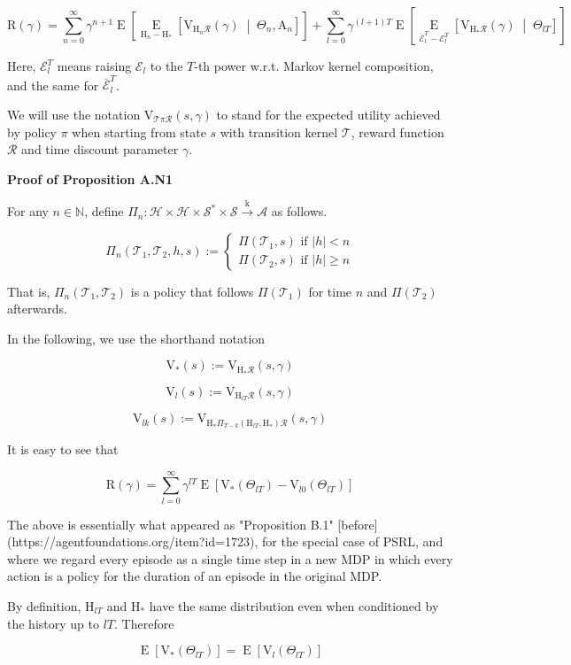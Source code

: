 \documentclass[a4paper]{article}
\newcommand{\Co}[1]{}
\newcommand{\AP}[1]{\left(#1\right)}
\newcommand{\AB}[1]{\left[#1\right]}
\newcommand{\ABM}[2]{\left[#1\;\middle\vert\;#2\right]}
\newcommand{\Ea}[2]{\underset{#1}{\operatorname{E}}\AB{#2}}
\newcommand{\CE}[3]{\underset{#1}{\operatorname{E}}\ABM{#2}{#3}}
\newcommand{\Nats}{\mathbb{N}}
\newcommand{\Abs}[1]{\left\vert #1 \right\vert}
\newcommand{\K}{\xrightarrow{\mathrm{k}}}
\newcommand{\St}{\mathcal{S}}
\newcommand{\A}{\mathcal{A}}
\newcommand{\R}{\mathcal{R}}
\newcommand{\T}{\mathcal{T}}
\newcommand{\Hy}{\mathcal{H}}
\newcommand{\V}{\mathrm{V}}
\newcommand{\Reg}{\mathrm{R}}
\newcommand{\AT}{\mathrm{A}}
\newcommand{\THy}{\mathrm{H}_*}
\newcommand{\SHy}{\mathrm{H}}
\newcommand{\Ev}{\mathcal{E}}
\begin{document}
$$\Reg(\gamma)=\sum_{n=0}^\infty\gamma^{n+1}\Ea{}{\CE{\SHy_n-\THy}{\V_{\SHy_n\R}(\gamma)}{\Theta_n,\AT_n}}+\sum_{l=0}^\infty{\gamma^{(l+1)T}}\Ea{}{\CE{\bar{\Ev}_{l}^T-\Ev_{l}^T}{\V_{\SHy_*\R}(\gamma)}{\Theta_{lT}}}$$

Here, $\Ev_l^T$ means raising $\Ev_l$ to the $T$-th power w.r.t. Markov kernel composition, and the same for $\bar{\Ev}_l^T$.

We will use the notation $\V_{\T\pi\R}(s,\gamma)$ to stand for the expected utility achieved by policy $\pi$ when starting from state $s$ with transition kernel $\T$, reward function $\R$ and time discount parameter $\gamma$.

\textbf{Proof of Proposition A.N1}\Co{b}

For any $n\in\Nats$, define $\Pi_n:\Hy\times\Hy\times\St^*\times\St\K\A$ as follows.

$$\Pi_n\AP{\T_1,\T_2,h,s}:=\begin{cases} \Pi\AP{\T_1,s} \text{ if } \Abs{h}<n \\ \Pi\AP{\T_2,s} \text{ if }\Abs{h} \geq n \end{cases}$$

That is, $\Pi_n\AP{\T_1,\T_2}$ is a policy that follows $\Pi\AP{\T_1}$ for time $n$ and $\Pi\AP{\T_2}$ afterwards. 

In the following, we use the shorthand notation 

$$\V_*(s):=\V_{\SHy_*\R}(s,\gamma)$$

$$\V_l(s):=\V_{\SHy_{lT}\R}(s,\gamma)$$

$$\V_{lk}(s):=\V_{\SHy_{*}\Pi_{T-k}\AP{\SHy_{lT},\SHy_*}\R}\AP{s,\gamma}$$

It is easy to see that

$$\Reg(\gamma)=\sum_{l=0}^\infty{\gamma^{lT}\Ea{}{\V_{*}\AP{\Theta_{lT}}-\V_{l0}\AP{\Theta_{lT}}}}$$

The above is essentially what appeared as "Proposition B.1" [before](https://agentfoundations.org/item?id=1723), for the special case of PSRL, and where we regard every episode as a single time step in a new MDP in which every action is a policy for the duration of an episode in the original MDP.

By definition, $\SHy_{lT}$ and $\SHy_*$ have the same distribution even when conditioned by the history up to $lT$. Therefore

$$\Ea{}{\V_{*}\AP{\Theta_{lT}}}=\Ea{}{\V_{l}\AP{\Theta_{lT}}}$$
\end{document}
